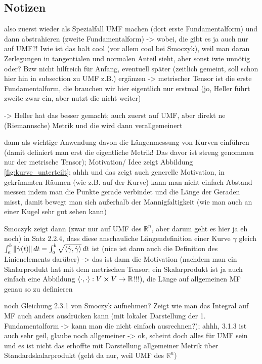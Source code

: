		\subsection{Notizen}
also zuerst wieder als Spezialfall UMF machen (dort erste Fundamentalform) und dann abstrahieren (zweite Fundamentalform) -> wobei, die gibt es ja auch nur auf UMF?! Iwie ist das halt cool (vor allem cool bei Smoczyk), weil man daran Zerlegungen in tangentialen und normalen Anteil sieht, aber sonst iwie unnötig oder? Bzw nicht hilfreich für Anfang, eventuell später (zeitlich gemeint, soll schon hier hin in subsection zu UMF z.B.) ergänzen -> metrischer Tensor ist die erste Fundamentalform, die brauchen wir hier eigentlich nur erstmal (jo, Heller führt zweite zwar ein, aber nutzt die nicht weiter)

-> Heller hat das besser gemacht; auch zuerst auf UMF, aber direkt ne (Riemannsche) Metrik und die wird dann verallgemeinert


dann als wichtige Anwendung davon die Längenmessung von Kurven einführen (damit definiert man erst die eigentliche Metrik! Das davor ist streng genommen nur der metrische Tensor); Motivation/ Idee zeigt Abbildung \ref{fig:kurve_unterteilt}; ahhh und das zeigt auch generelle Motivation, in gekrümmten Räumen (wie z.B. auf der Kurve) kann man nicht einfach Abstand messen indem man die Punkte gerade verbindet und die Länge der Geraden misst, damit bewegt man sich außerhalb der Mannigfaltigkeit (wie man auch an einer Kugel sehr gut sehen kann)



Smoczyk zeigt dann (zwar nur auf UMF des $\mathbb{R}^n$, aber darum geht es hier ja eh noch) in Satz 2.2.4, dass diese anschauliche Längendefinition einer Kurve $\gamma$ gleich $\int_a^b \norm{\dot{\gamma}(t)} \, dt = \int_a^b \sqrt{\langle \dot{\gamma}, \dot{\gamma} \rangle} \, dt$ ist (nice ist dann auch die Definition des Linienelements darüber) -> das ist dann die Motivation (nachdem man ein Skalarprodukt hat mit dem metrischen Tensor; ein Skalarprodukt ist ja auch einfach eine Abbildung $\langle \cdot, \cdot \rangle: V \cross V \rightarrow \mathbb{R}$!!!), die Länge auf allgemeinen MF genau so zu definieren



noch Gleichung 2.3.1 von Smoczyk aufnehmen? Zeigt wie man das Integral auf MF auch anders ausdrücken kann (mit lokaler Darstellung der 1. Fundamentalform -> kann man die nicht einfach ausrechnen?); ahhh, 3.1.3 ist auch sehr geil, glaube noch allgemeiner -> ok, scheint doch alles für UMF sein und es ist nicht das erhoffte mit Darstellung allgemeiner Metrik über Standardskalarprodukt (geht da nur, weil UMF des $\mathbb{R}^n$)



